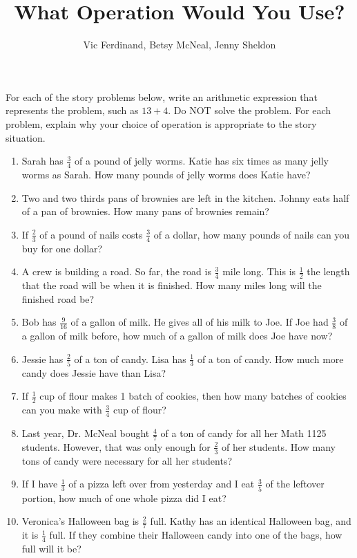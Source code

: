\documentclass[handout]{ximera}
\title{What Operation Would You Use?}
\author{Vic Ferdinand, Betsy McNeal, Jenny Sheldon}
\begin{document}
\begin{abstract} \end{abstract}
\maketitle


\begin{problem}
For each of the story problems below, write an arithmetic expression that represents the problem, such as $13+4$.  Do NOT solve the problem.  For each problem, explain why your choice of operation is appropriate to the story situation.

\vskip 0.1in

\begin{enumerate}\itemsep0.7in

	\item Sarah has $\frac34$ of a pound of jelly worms.  Katie has six times as many jelly worms as Sarah.  How many pounds of jelly worms does Katie have?
	
	\item Two and two thirds pans of brownies are left in the kitchen.  Johnny eats half of a pan of brownies.  How many pans of brownies remain?

	\item  If $\frac23$ of a pound of nails costs $\frac34$ of a dollar,  how many pounds of nails can you buy for one dollar?

	\item  A crew is building a road.  So far, the road is $\frac34$ mile long.  This is $\frac12$ the length that the road will be when it is finished.  How many miles long will the finished road be?

	\item  Bob has $\frac{9}{16}$ of a gallon of milk.  He gives all of his milk to Joe.  If Joe had $\frac38$ of a gallon of milk before, how much of a gallon of milk does Joe have now?
	
	\item Jessie has $\frac25$ of a ton of candy.  Lisa has $\frac13$ of a ton of candy.  How much more candy does Jessie have than Lisa?

	\item If $\frac12$ cup of flour makes 1 batch of cookies, then how many batches of cookies can you make with $\frac34$ cup of flour?
	
	\item Last year, Dr. McNeal bought $\frac47$ of a ton of candy for all her Math 1125 students.  However, that was only enough for $\frac23$ of her students.  How many tons of candy were necessary for all her students?

	\item  If I have $\frac13$ of a pizza left over from yesterday and I eat $\frac35$ of the leftover portion, how much of one whole pizza did I eat?
		
	\item Veronica's Halloween bag is $\frac27$ full.  Kathy has an identical Halloween bag, and it is $\frac14$ full.  If they combine their Halloween candy into one of the bags, how full will it be?

\end{enumerate}
\end{problem}
\end{document}
